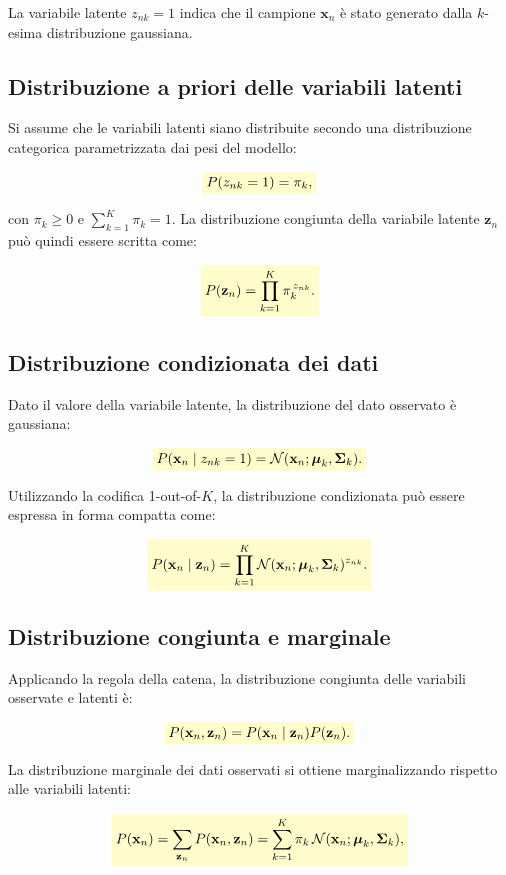 \documentclass[a4paper,12pt]{report}
\newcommand{\highlight}[1]{%
\colorbox{yellow!20}{$\displaystyle #1$}%
}
\begin{document}
La variabile latente $z_{nk} = 1$ indica che il campione $\mathbf{x}_n$ è stato generato dalla $k$-esima distribuzione gaussiana.

\subsection{Distribuzione a priori delle variabili latenti}

Si assume che le variabili latenti siano distribuite secondo una distribuzione categorica parametrizzata dai pesi del modello:

\[
\highlight{
P(z_{nk} = 1) = \pi_k,}
\]

con $\pi_k \geq 0$ e $\sum_{k=1}^{K} \pi_k = 1$.
La distribuzione congiunta della variabile latente $\mathbf{z}_n$ può quindi essere scritta come:

\[
\highlight{
P(\mathbf{z}_n) = \prod_{k=1}^{K} \pi_k^{\, z_{nk}}.}
\]

\subsection{Distribuzione condizionata dei dati}

Dato il valore della variabile latente, la distribuzione del dato osservato è gaussiana:

\[
\highlight{
P(\mathbf{x}_n \mid z_{nk} = 1) = \mathcal{N}(\mathbf{x}_n; \boldsymbol{\mu}_k, \boldsymbol{\Sigma}_k).}
\]

Utilizzando la codifica 1-out-of-$K$, la distribuzione condizionata può essere espressa in forma compatta come:

\[
\highlight{
P(\mathbf{x}_n \mid \mathbf{z}_n)
= \prod_{k=1}^{K}
\mathcal{N}(\mathbf{x}_n; \boldsymbol{\mu}_k, \boldsymbol{\Sigma}_k)^{z_{nk}}.}
\]

\subsection{Distribuzione congiunta e marginale}

Applicando la regola della catena, la distribuzione congiunta delle variabili osservate e latenti è:

\[
\highlight{
P(\mathbf{x}_n, \mathbf{z}_n)
= P(\mathbf{x}_n \mid \mathbf{z}_n) P(\mathbf{z}_n).}
\]

La distribuzione marginale dei dati osservati si ottiene marginalizzando rispetto alle variabili latenti:

\[
\highlight{
P(\mathbf{x}_n) = \sum_{\mathbf{z}_n} P(\mathbf{x}_n, \mathbf{z}_n)
= \sum_{k=1}^{K} \pi_k \, \mathcal{N}(\mathbf{x}_n; \boldsymbol{\mu}_k, \boldsymbol{\Sigma}_k),}
\]
\end{document}
